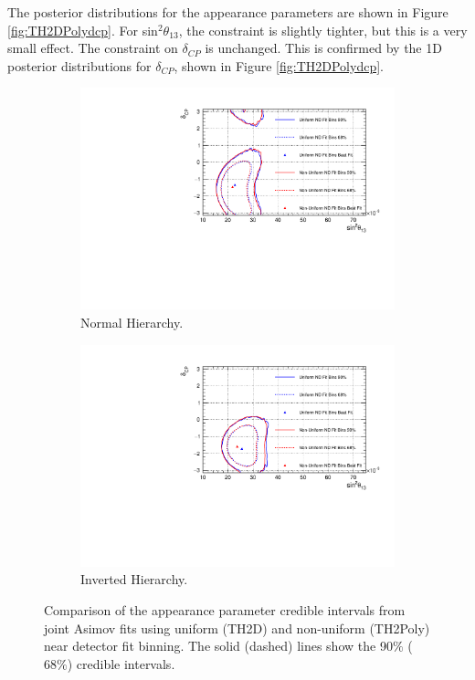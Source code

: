 The posterior distributions for the appearance parameters are shown in Figure \ref{fig:TH2DPolydcp}. For sin$^2\theta_{13}$, the constraint is slightly tighter, but this is a very small effect. The constraint on $\delta_{CP}$ is unchanged. This is confirmed by the 1D posterior distributions for $\delta_{CP}$, shown in Figure \ref{fig:TH2DPolydcp}.

\begin{figure}[!htbp]
\centering
\begin{subfigure}{.7\textwidth}
  \centering
  \includegraphics[width=0.95\linewidth]{figs/compMaCh3Contours_TH2DvsTHPoly_asimov/compMaCh3Contours_TH2DvsTHPoly_app_asimovA_NH}
  \caption{Normal Hierarchy.}
  \label{fig:TH2DPolyAppNH}
\end{subfigure}
\begin{subfigure}{.7\textwidth}
  \centering
  \includegraphics[width=0.95\linewidth]{figs/compMaCh3Contours_TH2DvsTHPoly_asimov/compMaCh3Contours_TH2DvsTHPoly_app_asimovA_IH}
  \caption{Inverted Hierarchy.}
  \label{fig:TH2DPolyAppIH}
\end{subfigure}
\caption{Comparison of the appearance parameter credible intervals from joint Asimov fits using uniform (TH2D) and non-uniform (TH2Poly) near detector fit binning. The solid (dashed) lines show the 90$\%$ ($68\%$) credible intervals.}
\label{fig:TH2DPolyApp}
\end{figure}

